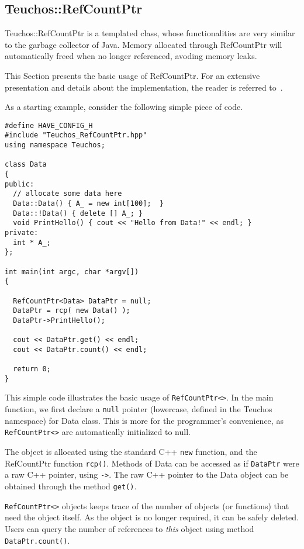 
\subsection{Teuchos::RefCountPtr}
\label{sec:teuchos:RefCountPtr}

Teuchos::RefCountPtr is a templated class, whose functionalities are very
similar to the garbage collector of Java. Memory allocated through
RefCountPtr will automatically freed when no longer referenced, avoding
memory leaks.

This Section presents the basic usage of RefCountPtr. For an extensive
presentation and details about the implementation, the reader is
referred to~\cite{RefCountPtr-guide}. 

As a starting example, consider the following simple piece of
code. 
\begin{verbatim}
#define HAVE_CONFIG_H
#include "Teuchos_RefCountPtr.hpp"
using namespace Teuchos;

class Data 
{
public:
  // allocate some data here
  Data::Data() { A_ = new int[100];  }
  Data::!Data() { delete [] A_; }
  void PrintHello() { cout << "Hello from Data!" << endl; }
private:
  int * A_;
};

int main(int argc, char *argv[]) 
{

  RefCountPtr<Data> DataPtr = null;
  DataPtr = rcp( new Data() );
  DataPtr->PrintHello();

  cout << DataPtr.get() << endl;
  cout << DataPtr.count() << endl;

  return 0;
}
\end{verbatim}
This simple code illustrates the basic usage of \verb!RefCountPtr<>!. In
the main function, we first declare a \verb!null! pointer (lowercase,
defined in the Teuchos namespace) for Data class. This is more for the
programmer's convenience, as \verb!RefCountPtr<>! are automatically
initialized to null.

The object is allocated using the standard C++ \verb!new! function, and
the RefCountPtr function \verb!rcp()!.  Methods of Data can be accessed
as if \verb!DataPtr! were a raw C++ pointer, using \verb!->!.  The raw
C++ pointer to the Data object can be obtained through the method
\verb!get()!.

\verb!RefCountPtr<>! objects keeps trace of the number of objects (or
functions) that need the object itself. As the object is no longer
required, it can be safely deleted. Users can query the number of
references to {\sl this} object using method \verb!DataPtr.count()!.

